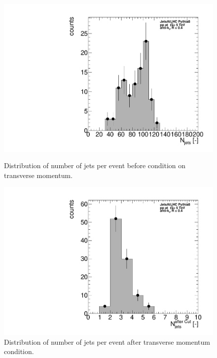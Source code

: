 \documentclass[a4paper,10pt]{article}
\begin{document}
\begin{figure}[htbp]
    \centering
    \begin{minipage}{0.45\textwidth}
        \centering
        \includegraphics[width=\textwidth]{figures/hNJetsPerEvent.pdf}
        \caption{Distribution of number of jets per event before condition on transverse momentum.}
        \label{f3}
    \end{minipage}\hfill
    \begin{minipage}{0.45\textwidth}
        \centering
        \includegraphics[width=\textwidth]{figures/hNJetsPerEventCut.pdf}
        \caption{Distribution of number of jets per event after transverse momentum condition. }
        \label{f4}
    \end{minipage}
\end{figure}
\end{document}
